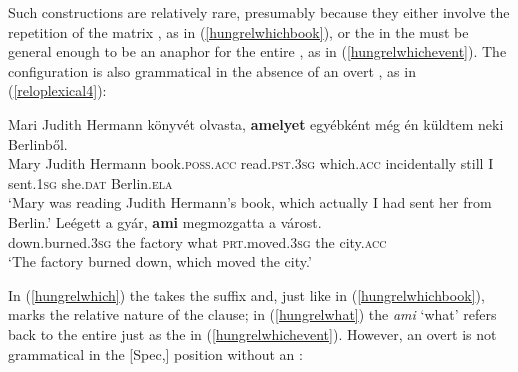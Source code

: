 Such constructions are relatively rare, presumably because they either involve the repetition of the matrix  , as in (\ref{hungrelwhichbook}), or the  in the  must be general enough to be an anaphor for the entire , as in (\ref{hungrelwhichevent}). The configuration is also grammatical in the absence of an overt , as in (\ref{reloplexical4}):

\ea \label{reloplexical4}
\ea \gll Mari	Judith Hermann	könyvét olvasta, \textbf{amelyet} egyébként még én	küldtem	neki	Berlinből. \label{hungrelwhich}\\
Mary Judith	Hermann	book.\textsc{poss.acc} read.\textsc{pst.3sg} which.\textsc{acc} incidentally still I sent.\textsc{1sg} she.\textsc{dat} Berlin.\textsc{ela}\\
\glt `Mary was reading Judith Hermann's book, which actually I had sent her from Berlin.'
\ex \gll Leégett	a	gyár,	\textbf{ami} megmozgatta	a	várost. \label{hungrelwhat}\\
down.burned.\textsc{3sg} the factory what \textsc{prt}.moved.\textsc{3sg} the city.\textsc{acc}\\
\glt `The factory burned down, which moved the city.'
\z
\z

\largerpage[1]
In (\ref{hungrelwhich}) the  takes the  suffix and, just like in (\ref{hungrelwhichbook}), marks the relative nature of the clause; in (\ref{hungrelwhat}) the  \textit{ami} `what' refers back to the entire  just as the  in (\ref{hungrelwhichevent}). However, an overt  is not grammatical in the [Spec,] position without an :

\ea \label{hungrelungrammatical}
\z
\z

